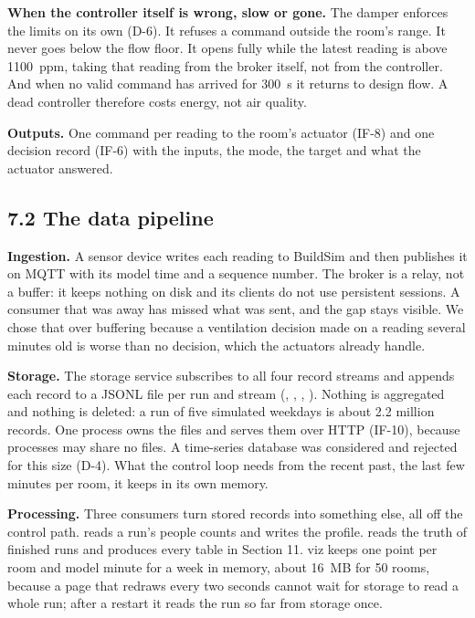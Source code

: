 \textbf{When the controller itself is wrong, slow or gone.} The damper enforces
the limits on its own (D-6). It refuses a command outside the room's range. It
never goes below the flow floor. It opens fully while the latest \COtwo{}
reading is above 1100~ppm, taking that reading from the broker itself, not from
the controller. And when no valid command has arrived for 300~s it returns to
design flow. A dead controller therefore costs energy, not air quality.

\textbf{Outputs.} One command per reading to the room's actuator (IF-8) and
one decision record (IF-6) with the inputs, the mode, the target and what the
actuator answered.

\subsection{7.2 The data pipeline}

\textbf{Ingestion.} A sensor device writes each reading to BuildSim and then
publishes it on MQTT with its model time and a sequence number. The broker is
a relay, not a buffer: it keeps nothing on disk and its clients do not use
persistent sessions. A consumer that was away has missed what was sent, and
the gap stays visible. We chose that over buffering because a ventilation
decision made on a reading several minutes old is worse than no decision,
which the actuators already handle.

\textbf{Storage.} The storage service subscribes to all four record streams
and appends each record to a JSONL file per run and stream
(, , ,
). Nothing is aggregated and nothing is deleted: a run of
five simulated weekdays is about 2.2 million records. One process owns the
files and serves them over HTTP (IF-10), because processes may share no files.
A time-series database was considered and rejected for this size (D-4). What
the control loop needs from the recent past, the last few minutes per room, it
keeps in its own memory.

\textbf{Processing.} Three consumers turn stored records into something else,
all off the control path.  reads a run's people counts and writes
the profile.  reads the truth of finished runs and produces
every table in Section 11. viz keeps one point per room and model minute for a
week in memory, about 16~MB for 50 rooms, because a page that redraws every two
seconds cannot wait for storage to read a whole run; after a restart it reads
the run so far from storage once.

